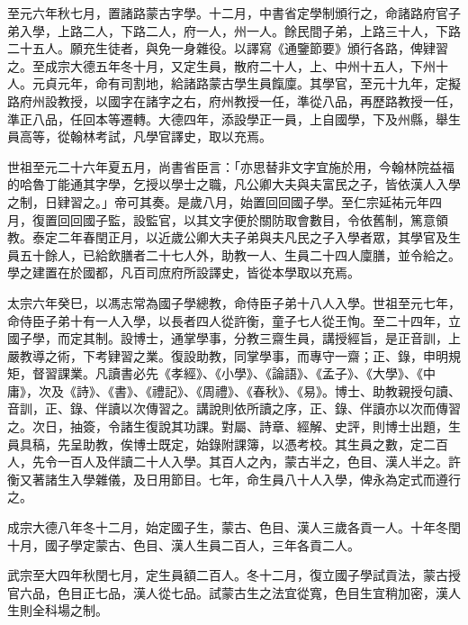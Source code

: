 \begin{pinyinscope}
 至元六年秋七月，置諸路蒙古字學。十二月，中書省定學制頒行之，命諸路府官子弟入學，上路二人，下路二人，府一人，州一人。餘民間子弟，上路三十人，下路二十五人。願充生徒者，與免一身雜役。以譯寫《通鑒節要》頒行各路，俾肄習之。至成宗大德五年冬十月，又定生員，散府二十人，上、中州十五人，下州十人。元貞元年，命有司割地，給諸路蒙古學生員餼廩。其學官，至元十九年，定擬路府州設教授，以國字在諸字之右，府州教授一任，準從八品，再歷路教授一任，準正八品，任回本等遷轉。大德四年，添設學正一員，上自國學，下及州縣，舉生員高等，從翰林考試，凡學官譯史，取以充焉。



 世祖至元二十六年夏五月，尚書省臣言：「亦思替非文字宜施於用，今翰林院益福的哈魯丁能通其字學，乞授以學士之職，凡公卿大夫與夫富民之子，皆依漢人入學之制，日肄習之。」帝可其奏。是歲八月，始置回回國子學。至仁宗延祐元年四月，復置回回國子監，設監官，以其文字便於關防取會數目，令依舊制，篤意領教。泰定二年春閏正月，以近歲公卿大夫子弟與夫凡民之子入學者眾，其學官及生員五十餘人，已給飲膳者二十七人外，助教一人、生員二十四人廩膳，並令給之。學之建置在於國都，凡百司庶府所設譯史，皆從本學取以充焉。



 太宗六年癸巳，以馮志常為國子學總教，命侍臣子弟十八人入學。世祖至元七年，命侍臣子弟十有一人入學，以長者四人從許衡，童子七人從王恂。至二十四年，立國子學，而定其制。設博士，通掌學事，分教三齋生員，講授經旨，是正音訓，上嚴教導之術，下考肄習之業。復設助教，同掌學事，而專守一齋；正、錄，申明規矩，督習課業。凡讀書必先《孝經》、《小學》、《論語》、《孟子》、《大學》、《中庸》，次及《詩》、《書》、《禮記》、《周禮》、《春秋》、《易》。博士、助教親授句讀、音訓，正、錄、伴讀以次傳習之。講說則依所讀之序，正、錄、伴讀亦以次而傳習之。次日，抽簽，令諸生復說其功課。對屬、詩章、經解、史評，則博士出題，生員具稿，先呈助教，俟博士既定，始錄附課簿，以憑考校。其生員之數，定二百人，先令一百人及伴讀二十人入學。其百人之內，蒙古半之，色目、漢人半之。許衡又著諸生入學雜儀，及日用節目。七年，命生員八十人入學，俾永為定式而遵行之。



 成宗大德八年冬十二月，始定國子生，蒙古、色目、漢人三歲各貢一人。十年冬閏十月，國子學定蒙古、色目、漢人生員二百人，三年各貢二人。



 武宗至大四年秋閏七月，定生員額二百人。冬十二月，復立國子學試貢法，蒙古授官六品，色目正七品，漢人從七品。試蒙古生之法宜從寬，色目生宜稍加密，漢人生則全科場之制。




\end{pinyinscope}
